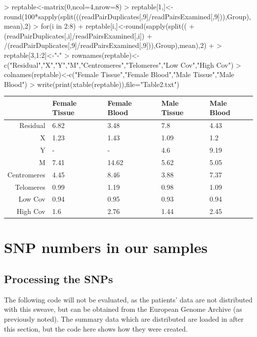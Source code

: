 \documentclass{article}
\begin{document}
\begin{Schunk}
\begin{Sinput}
> reptable<-matrix(0,ncol=4,nrow=8)
> reptable[1,]<-round(100*sapply(split(((readPairDuplicates[,9]/readPairsExamined[,9])),Group),mean),2)
> for(i in 2:8){
+   reptable[i,]<-round(sapply(split((
+     (readPairDuplicates[,i]/readPairsExamined[,i])
+     /(readPairDuplicates[,9]/readPairsExamined[,9])),Group),mean),2)
+ }
> reptable[3,1:2]<-"-"
> rownames(reptable)<-c("Residual","X","Y","M","Centromeres","Telomeres","Low Cov","High Cov")
> colnames(reptable)<-c("Female Tissue","Female Blood","Male Tissue","Male Blood")
> write(print(xtable(reptable)),file="Table2.txt")
\end{Sinput}
\begin{table}[ht]
\centering
\begin{tabular}{rllll}
  \hline
 & Female Tissue & Female Blood & Male Tissue & Male Blood \\ 
  \hline
Residual & 6.82 & 3.48 & 7.8 & 4.43 \\ 
  X & 1.23 & 1.43 & 1.09 & 1.2 \\ 
  Y & - & - & 4.6 & 9.19 \\ 
  M & 7.41 & 14.62 & 5.62 & 5.05 \\ 
  Centromeres & 4.45 & 8.46 & 3.88 & 7.37 \\ 
  Telomeres & 0.99 & 1.19 & 0.98 & 1.09 \\ 
  Low Cov & 0.94 & 0.95 & 0.93 & 0.94 \\ 
  High Cov & 1.6 & 2.76 & 1.44 & 2.45 \\ 
   \hline
\end{tabular}
\end{table}\end{Schunk}


\clearpage{}

\section{SNP numbers in our samples}

\subsection{Processing the SNPs}

The following code will not be evaluated, as the patients' data are not distributed with this sweave, but can be obtained from the European Genome Archive (as previously noted). The summary data which are distributed are loaded in after this section, but the code here shows how they were created.
\end{document}
